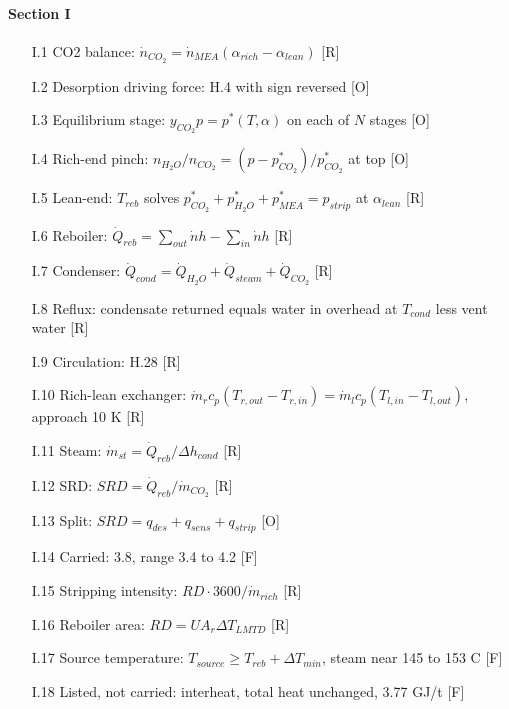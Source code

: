 \paragraph{Section I}
\begin{enumerate}[leftmargin=1.4cm,itemsep=0pt,topsep=2pt,parsep=0pt]\small
\item[I.1] CO2 balance: $\dot n_{CO_2}=\dot n_{MEA}(\alpha_{rich}-\alpha_{lean})$ {\footnotesize [R]}
\item[I.2] Desorption driving force: H.4 with sign reversed {\footnotesize [O]}
\item[I.3] Equilibrium stage: $y_{CO_2}p=p^*(T,\alpha)$ on each of $N$ stages {\footnotesize [O]}
\item[I.4] Rich-end pinch: $n_{H_2O}/n_{CO_2}=(p-p^*_{CO_2})/p^*_{CO_2}$ at top {\footnotesize [O]}
\item[I.5] Lean-end: $T_{reb}$ solves $p^*_{CO_2}+p^*_{H_2O}+p^*_{MEA}=p_{strip}$ at $\alpha_{lean}$ {\footnotesize [R]}
\item[I.6] Reboiler: $\dot Q_{reb}=\sum_{out}\dot nh-\sum_{in}\dot nh$ {\footnotesize [R]}
\item[I.7] Condenser: $\dot Q_{cond}=\dot Q_{H_2O}+\dot Q_{steam}+\dot Q_{CO_2}$ {\footnotesize [R]}
\item[I.8] Reflux: condensate returned equals water in overhead at $T_{cond}$ less vent water {\footnotesize [R]}
\item[I.9] Circulation: H.28 {\footnotesize [R]}
\item[I.10] Rich-lean exchanger: $\dot m_rc_p(T_{r,out}-T_{r,in})=\dot m_lc_p(T_{l,in}-T_{l,out})$, approach 10 K {\footnotesize [R]}
\item[I.11] Steam: $\dot m_{st}=\dot Q_{reb}/\Delta h_{cond}$ {\footnotesize [R]}
\item[I.12] SRD: $SRD=\dot Q_{reb}/\dot m_{CO_2}$ {\footnotesize [R]}
\item[I.13] Split: $SRD=q_{des}+q_{sens}+q_{strip}$ {\footnotesize [O]}
\item[I.14] Carried: 3.8, range 3.4 to 4.2 {\footnotesize [F]}
\item[I.15] Stripping intensity: $RD\cdot3600/\dot m_{rich}$ {\footnotesize [R]}
\item[I.16] Reboiler area: $RD=UA_r\Delta T_{LMTD}$ {\footnotesize [R]}
\item[I.17] Source temperature: $T_{source}\ge T_{reb}+\Delta T_{min}$, steam near 145 to 153 C {\footnotesize [F]}
\item[I.18] Listed, not carried: interheat, total heat unchanged, 3.77 GJ/t {\footnotesize [F]}
\end{enumerate}
